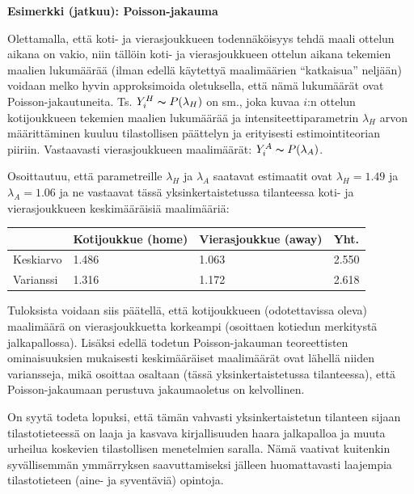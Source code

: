 \documentclass[
]{book}
\begin{document}
\begin{eblock}{}
\textbf{Esimerkki (jatkuu): Poisson-jakauma}

Olettamalla, että koti- ja vierasjoukkueen todennäköisyys tehdä maali ottelun aikana on vakio, niin tällöin koti- ja vierasjoukkueen ottelun aikana tekemien maalien lukumäärää (ilman edellä käytettyä maalimäärien ``katkaisua'' neljään) voidaan melko hyvin approksimoida oletuksella, että nämä lukumäärät ovat Poisson-jakautuneita. Ts. \(Y^H_i \thicksim P(\lambda_H)\) on sm., joka kuvaa \(i\):n ottelun kotijoukkueen tekemien maalien lukumäärää ja intensiteettiparametrin \(\lambda_H\) arvon määrittäminen kuuluu tilastollisen päättelyn ja erityisesti estimointiteorian piiriin. Vastaavasti vierasjoukkueen maalimäärät: \(Y^A_i \thicksim P(\lambda_A)\).

Osoittautuu, että parametreille \(\lambda_H\) ja \(\lambda_A\) saatavat estimaatit ovat \(\lambda_H = 1.49\) ja \(\lambda_A = 1.06\) ja ne vastaavat tässä yksinkertaistetussa tilanteessa koti- ja vierasjoukkueen keskimääräisiä maalimääriä:

\end{eblock}

\FloatBarrier

\begin{tabular}{llll}
\toprule
  & Kotijoukkue (home) & Vierasjoukkue (away) & Yht.\\
\midrule
Keskiarvo & 1.486 & 1.063 & 2.550\\
Varianssi & 1.316 & 1.172 & 2.618\\
\bottomrule
\end{tabular}

\begin{eblock}{}
Tuloksista voidaan siis päätellä, että kotijoukkueen (odotettavissa oleva) maalimäärä on vierasjoukkuetta korkeampi (osoittaen kotiedun merkitystä jalkapallossa). Lisäksi edellä todetun Poisson-jakauman teoreettisten ominaisuuksien mukaisesti keskimääräiset maalimäärät ovat lähellä niiden variansseja, mikä osoittaa osaltaan (tässä yksinkertaistetussa tilanteessa), että Poisson-jakaumaan perustuva jakaumaoletus on kelvollinen.

On syytä todeta lopuksi, että tämän vahvasti yksinkertaistetun tilanteen sijaan tilastotieteessä on laaja ja kasvava kirjallisuuden haara jalkapalloa ja muuta urheilua koskevien tilastollisen menetelmien saralla. Nämä vaativat kuitenkin syvällisemmän ymmärryksen saavuttamiseksi jälleen huomattavasti laajempia tilastotieteen (aine- ja syventäviä) opintoja.

\end{eblock}
\end{document}
